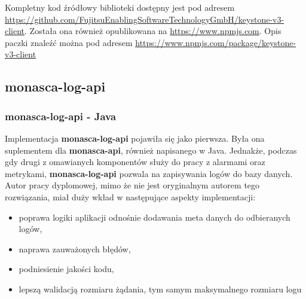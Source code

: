 Kompletny kod źródłowy biblioteki dostępny jest pod adresem \url{https://github.com/FujitsuEnablingSoftwareTechnologyGmbH/keystone-v3-client}.
Została ona również opublikowana na \url{https://www.npmjs.com}. 
Opis paczki znaleźć można pod adresem \url{https://www.npmjs.com/package/keystone-v3-client}

\subsection{monasca-log-api}

    \subsubsection{monasca-log-api - Java}
    Implementacja \textbf{monasca-log-api} pojawiła się jako pierwsza. Była ona suplementem dla \textbf{monasca-api}, również napisanego w Java.
    Jednakże, podczas gdy drugi z omawianych komponentów służy do pracy z alarmami oraz metrykami, \textbf{monasca-log-api} pozwala na zapisywania
    logów do bazy danych. Autor pracy dyplomowej, mimo że nie jest oryginalnym autorem tego rozwiązania, miał duży wkład w następujące aspekty
    implementacji:
    \begin{itemize}
        \item poprawa logiki aplikacji odnośnie dodawania meta danych do odbieranych logów,
        \item naprawa zauważonych błędów,
        \item podniesienie jakości kodu,
        \item lepszą walidacją rozmiaru żądania, tym samym maksymalnego rozmiaru logu
    \end{itemize}

